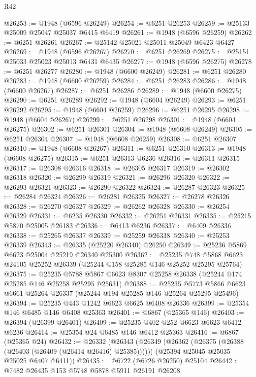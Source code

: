 \begin{lexlean}{R42}
\begin{coremodule}
{@26253 := @1948 (@6596 @26249)
@26254 := @6251 @26253
@26259 := @25133 @25009 @25047 @25037 @6415 @6419
@26261 := @1948 (@6596 @26259)
@26262 := @6251 @26261
@26267 := @25142 @25021 @25011 @25049 @6423 @6427
@26269 := @1948 (@6596 @26267)
@26270 := @6251 @26269
@26275 := @25151 @25033 @25023 @25013 @6431 @6435
@26277 := @1948 (@6596 @26275)
@26278 := @6251 @26277
@26280 := @1948 (@6600 @26249)
@26281 := @6251 @26280
@26283 := @1948 (@6600 @26259)
@26284 := @6251 @26283
@26286 := @1948 (@6600 @26267)
@26287 := @6251 @26286
@26289 := @1948 (@6600 @26275)
@26290 := @6251 @26289
@26292 := @1948 (@6604 @26249)
@26293 := @6251 @26292
@26295 := @1948 (@6604 @26259)
@26296 := @6251 @26295
@26298 := @1948 (@6604 @26267)
@26299 := @6251 @26298
@26301 := @1948 (@6604 @26275)
@26302 := @6251 @26301
@26304 := @1948 (@6608 @26249)
@26305 := @6251 @26304
@26307 := @1948 (@6608 @26259)
@26308 := @6251 @26307
@26310 := @1948 (@6608 @26267)
@26311 := @6251 @26310
@26313 := @1948 (@6608 @26275)
@26315 := @6251 @26313 @6236
@26316 := @26311 @26315
@26317 := @26308 @26316
@26318 := @26305 @26317
@26319 := @26302 @26318
@26320 := @26299 @26319
@26321 := @26296 @26320
@26322 := @26293 @26321
@26323 := @26290 @26322
@26324 := @26287 @26323
@26325 := @26284 @26324
@26326 := @26281 @26325
@26327 := @26278 @26326
@26328 := @26270 @26327
@26329 := @26262 @26328
@26330 := @26254 @26329
@26331 := @6235 @26330
@26332 := @26251 @26331
@26335 := @25215 @5870 @25005 @26183
@26336 := @6413 @6236
@26337 := @6409 @26336
@26338 := @25265 @26337
@26339 := @25259 @26338
@26340 := @25253 @26339
@26343 := @26335 (@25220 @26340) @26250
@26349 := @25236 @5869 @6623 @25004 @25219 @26340 @25300
@26362 := @25235
    @748
    @5868
    @6623
    @24105
    @25252
    @26339
    (@25244 @158 @25285 @146 @25252 @25295 @25764)
@26375 := @25235
    @5788
    @5867
    @6623
    @8307
    @25258
    @26338
    (@25244 @174 @25285 @146 @25258 @25295 @25631)
@26388 := @25235
    @5773
    @5866
    @6623
    @6661
    @25264
    @26337
    (@25244 @194 @25285 @146 @25264 @25295 @25496)
@26394 := @25235 @443 @1242 @6623 @6625 @6408 @26336
@26399 := @25354 @146 @6485 @146 @6408 @25363
@26401 := @6867 (@25365 @146)
@26403 := @26394 (@26399 @26401)
@26409 := @25235 @402 @252 @6623 @6623 @6412 @6236
@26414 := @25354 @24 @6485 @146 @6412 @25363
@26416 := @6867 (@25365 @24)
@26432 := @26332
    (@26343
      (@26349 (@26362 (@26375 (@26388 (@26403 (@26409 (@26414 @26416) @25385))))))
      (@25394 @25045 @25035 @25025 @6407 @6411))
@26435 := @6722 (@6726 @26250) @25104
@26442 := @7482 @26435 @153 @5748 @5878 @5911 @26191 @26208
}
\end{coremodule}
\end{lexlean}
